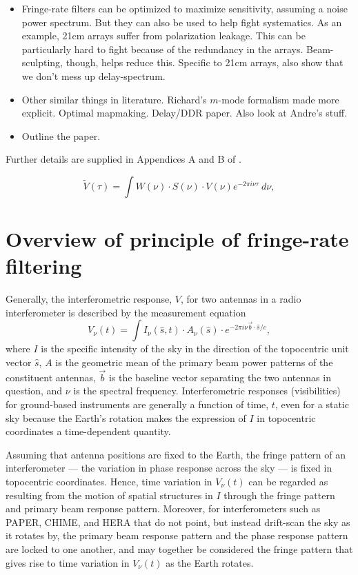 \documentclass[twocolumn,apj,numberedappendix]{emulateapj}
\begin{document}
\begin{itemize}
\item Fringe-rate filters can be optimized to maximize sensitivity, assuming a noise power spectrum.  But they can also be used to help fight systematics.  As an example, 21cm arrays suffer from polarization leakage.  This can be particularly hard to fight because of the redundancy in the arrays.  Beam-sculpting, though, helps reduce this.  Specific to 21cm arrays, also show that we don't mess up delay-spectrum.
\item Other similar things in literature.  Richard's $m$-mode formalism made more explicit.  Optimal mapmaking.  Delay/DDR paper.  Also look at Andre's stuff.
\item Outline the paper.
\end{itemize}
Further details are supplied in Appendices A and B of \citet{parsons_et_al2013}.

\begin{equation}
\tilde{V}(\tau)=\int{W(\nu)\cdot S(\nu)\cdot V(\nu)e^{-2\pi i\nu\tau}~d\nu},
\label{eq:dtransform}
\end{equation}



\section{Overview of principle of fringe-rate filtering}

Generally, the interferometric response, $V$, for two antennas in a radio interferometer is described
by the measurement equation
\begin{equation}
V_\nu(t)=\int{I_\nu(\hat s, t)\cdot A_\nu(\hat s)\cdot e^{-2\pi i\nu \vec b\cdot \hat s/c}},
\end{equation}
where $I$ is the specific intensity of the sky in the direction of the topocentric unit vector $\hat s$,
$A$ is the geometric mean of the primary beam power patterns of the constituent antennas,
$\vec b$ is the baseline vector separating the two antennas in question, and $\nu$ is the spectral
frequency.  Interferometric responses (visibilities) for ground-based instruments are generally 
a function of time, $t$, even for a static sky because the Earth's rotation makes the expression of $I$ 
in topocentric coordinates a time-dependent quantity.

Assuming that antenna positions are fixed to the Earth, the fringe pattern of an interferometer ---
the variation in phase response across the sky --- is fixed in topocentric coordinates.  Hence, time
variation in $V_\nu(t)$ can be regarded as resulting from the motion of spatial structures in $I$ through
the fringe pattern and primary beam response pattern.  Moreover, for interferometers such as PAPER, CHIME, and HERA 
that do not point, but instead drift-scan the sky as it rotates by, the primary beam response pattern and the
phase response pattern are locked to one another, and may together be considered the fringe pattern that gives rise
to time variation in $V_\nu(t)$ as the Earth rotates.
\end{document}
